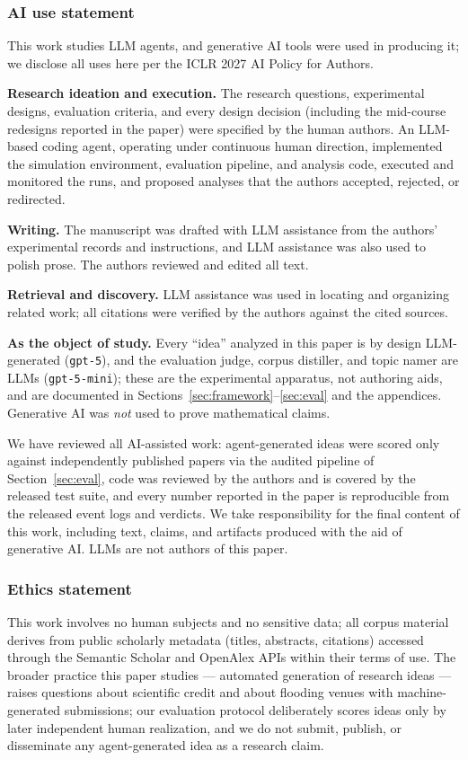 \documentclass{article} %
\begin{document}
\subsubsection*{AI use statement}
This work studies LLM agents, and generative AI tools were used in
producing it; we disclose all uses here per the ICLR 2027 AI Policy for
Authors.

\textbf{Research ideation and execution.} The research questions,
experimental designs, evaluation criteria, and every design decision
(including the mid-course redesigns reported in the paper) were
specified by the human authors. An LLM-based coding agent, operating
under continuous human direction, implemented the simulation
environment, evaluation pipeline, and analysis code, executed and
monitored the runs, and proposed analyses that the authors accepted,
rejected, or redirected.

\textbf{Writing.} The manuscript was drafted with LLM assistance from
the authors' experimental records and instructions, and LLM assistance
was also used to polish prose. The authors reviewed and edited all
text.

\textbf{Retrieval and discovery.} LLM assistance was used in locating
and organizing related work; all citations were verified by the authors
against the cited sources.

\textbf{As the object of study.} Every ``idea'' analyzed in this paper
is by design LLM-generated (\texttt{gpt-5}), and the evaluation judge,
corpus distiller, and topic namer are LLMs (\texttt{gpt-5-mini});
these are the experimental apparatus, not authoring aids, and are
documented in Sections~\ref{sec:framework}--\ref{sec:eval} and the
appendices. Generative AI was \emph{not} used to prove mathematical
claims.

We have reviewed all AI-assisted work: agent-generated ideas were
scored only against independently published papers via the audited
pipeline of Section~\ref{sec:eval}, code was reviewed by the authors
and is covered by the released test suite, and every number reported in
the paper is reproducible from the released event logs and verdicts. We
take responsibility for the final content of this work, including text,
claims, and artifacts produced with the aid of generative AI. LLMs are
not authors of this paper.

\subsubsection*{Ethics statement}
This work involves no human subjects and no sensitive data; all corpus
material derives from public scholarly metadata (titles, abstracts,
citations) accessed through the Semantic Scholar and OpenAlex APIs
within their terms of use. The broader practice this paper studies ---
automated generation of research ideas --- raises questions about
scientific credit and about flooding venues with machine-generated
submissions; our evaluation protocol deliberately scores ideas only by
later independent human realization, and we do not submit, publish, or
disseminate any agent-generated idea as a research claim.
\end{document}
